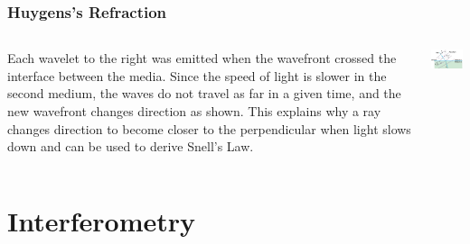 \documentclass{beamer}
\begin{document}
\begin{frame}\frametitle{Huygens's Refraction}
\begin{columns}
\begin{column}{6cm}
Each wavelet to the right was emitted when the wavefront crossed the interface between the media. Since the speed of light is slower in the second medium, the waves do not travel as far in a given time, and the new wavefront changes direction as shown. This explains why a ray changes direction to become closer to the perpendicular when light slows down and can be used to derive Snell's Law.
\end{column}
\begin{column}{5cm}
\begin{center}
\includegraphics[width=5cm]{fig/huyRefract.jpg}
\end{center}
\end{column}
\end{columns}
\end{frame}

\section{Interferometry}
\end{document}
